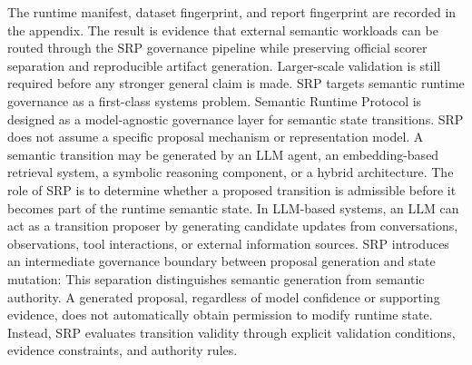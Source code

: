 {}\markdownRendererInterblockSeparator
{}The runtime manifest, dataset fingerprint, and report fingerprint are recorded in the appendix. The result is evidence that external semantic workloads can be routed through the SRP governance pipeline while preserving official scorer separation and reproducible artifact generation. Larger-scale validation is still required before any stronger general claim is made.\markdownRendererInterblockSeparator
{}
\markdownRendererSectionEnd 
\markdownRendererSectionEnd 
\markdownRendererSectionEnd \markdownRendererSectionBegin
{}\markdownRendererInterblockSeparator
{}SRP targets semantic runtime governance as a first-class systems problem.\markdownRendererInterblockSeparator
{}\markdownRendererSectionBegin
{}\markdownRendererInterblockSeparator
{}Semantic Runtime Protocol is designed as a model-agnostic governance layer for semantic state transitions. SRP does not assume a specific proposal mechanism or representation model. A semantic transition may be generated by an LLM agent, an embedding-based retrieval system, a symbolic reasoning component, or a hybrid architecture. The role of SRP is to determine whether a proposed transition is admissible before it becomes part of the runtime semantic state.\markdownRendererParagraphSeparator
{}In LLM-based systems, an LLM can act as a transition proposer by generating candidate updates from conversations, observations, tool interactions, or external information sources. SRP introduces an intermediate governance boundary between proposal generation and state mutation:\markdownRendererInterblockSeparator
{}\markdownRendererInterblockSeparator
{}This separation distinguishes semantic generation from semantic authority. A generated proposal, regardless of model confidence or supporting evidence, does not automatically obtain permission to modify runtime state. Instead, SRP evaluates transition validity through explicit validation conditions, evidence constraints, and authority rules.\markdownRendererParagraphSeparator

